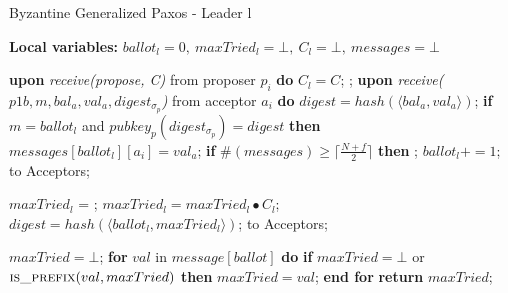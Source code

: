 \begin{algorithm}
	\caption{Byzantine Generalized Paxos - Leader l}
	\textbf{Local variables:} $ballot_l = 0,\ maxTried_l = \bot,\ C_l = \bot,\ messages = \bot$
	\begin{algorithmic}[1]
		\State \textbf{upon} \textit{receive(propose, C)} from proposer $p_i$ \textbf{do} 
		\State \hspace{\algorithmicindent} $C_l = C$;
		\State \hspace{\algorithmicindent} ;
		\State
		\State \textbf{upon} \textit{receive($p1b, m, bal_a, val_a, digest_{\sigma_p}$)} from acceptor $a_i$ \textbf{do}
		\State\hspace{\algorithmicindent} $digest = hash(\langle bal_a, val_a \rangle)$;
		\State \hspace{\algorithmicindent} \textbf{if} $m = ballot_l$ and $pubkey_p(digest_{\sigma_p}) = digest$ \textbf{then}
		\State\hspace{\algorithmicindent}\hspace{\algorithmicindent}\hspace{\algorithmicindent}  $messages[ballot_l][a_i] = val_a$;
		\State \hspace{\algorithmicindent} \textbf{if} $\#(messages) \geq \lceil \frac{N+f}{2}\rceil$ \textbf{then} 
		\State \hspace{\algorithmicindent}\hspace{\algorithmicindent} ;
		\State
		\State $ballot_l \mathrel{+{=}} 1$;
		\State {} to Acceptors;
		\EndFunction
		
		\State
		\State $maxTried_l$ = ;
		\State $maxTried_l = maxTried_l \bullet C_l$;
		\State $digest = hash(\langle ballot_l, maxTried_l \rangle)$;
		\State {} to Acceptors;
		\EndFunction
		
		\State
		\State $maxTried = \bot$;
		\State \textbf{for} $val$ in $message[ballot]$ \textbf{do}
		\State \hspace{\algorithmicindent} \textbf{if} $maxTried = \bot$ or $\Call{is\_prefix}{val, maxTried}$ \textbf{then}
		\State\hspace{\algorithmicindent}\hspace{\algorithmicindent} $maxTried = val$;
		\State \textbf{end for}
		\State \textbf{return} $maxTried$;
		\EndFunction
		

\end{algorithmic}
\end{algorithm}
